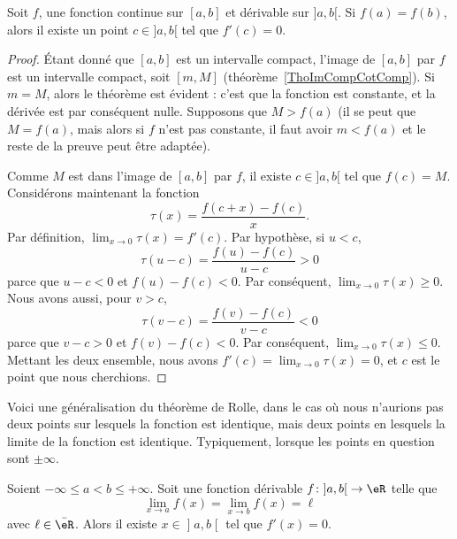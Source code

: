\begin{theorem}       \label{ThoRolle}
	Soit \( f\), une fonction continue sur \( [a,b]\) et dérivable sur \( ]a,b[\). Si \( f(a)=f(b)\), alors il existe un point \( c\in]a,b[\) tel que \( f'(c)=0\).
\end{theorem}

\begin{proof}
	Étant donné que \( [a,b]\) est un intervalle compact, l'image de \( [a,b]\) par \( f\) est un intervalle compact, soit \( [m,M]\) (théorème~\ref{ThoImCompCotComp}). Si \( m=M\), alors le théorème est évident : c'est que la fonction est constante, et la dérivée est par conséquent nulle. Supposons que \( M> f(a)\) (il se peut que \( M=f(a)\), mais alors si \( f\) n'est pas constante, il faut avoir \( m<f(a)\) et le reste de la preuve peut être adaptée).

	Comme \( M\) est dans l'image de \( [a,b]\) par \( f\), il existe \( c\in ]a,b[\) tel que \( f(c)=M\). Considérons maintenant la fonction
	\begin{equation}
		\tau(x) =\frac{ f(c+x)-f(c) }{ x }.
	\end{equation}
	Par définition, \( \lim_{x\to 0}\tau(x)=f'(c)\). Par hypothèse, si \( u<c\),
	\begin{equation}
		\tau(u-c) = \frac{ f(u)-f(c) }{ u-c }>0
	\end{equation}
	parce que \( u-c<0\) et \( f(u)-f(c)<0\). Par conséquent, \( \lim_{x\to 0}\tau(x)\geq 0\). Nous avons aussi, pour \( v>c\),
	\begin{equation}
		\tau(v-c) = \frac{ f(v)-f(c) }{ v-c }<0
	\end{equation}
	parce que \( v-c>0\) et \( f(v)-f(c)<0\). Par conséquent, \( \lim_{x\to 0}\tau(x)\leq 0\). Mettant les deux ensemble, nous avons \( f'(c)=\lim_{x\to 0}\tau(x)=0\), et \( c\) est le point que nous cherchions.
\end{proof}

Voici une généralisation du théorème de Rolle, dans le cas où nous n'aurions pas deux points sur lesquels la fonction est identique, mais deux points en lesquels la limite de la fonction est identique. Typiquement, lorsque les points en question sont \( \pm\infty\).
\begin{theorem}           \label{THOooXDTBooFeSZoK}
	Soient \( -\infty\leq a<b\leq +\infty\). Soit une fonction dérivable \( f\colon \mathopen] a , b \mathclose[\to \eR\) telle que
		\begin{equation}
			\lim_{x\to a} f(x)=\lim_{x\to b} f(x)=\ell
		\end{equation}
		avec \( \ell\in \bar \eR\). Alors il existe \( x\in \mathopen] a , b \mathclose[\) tel que \( f'(x)=0\).
\end{theorem}


